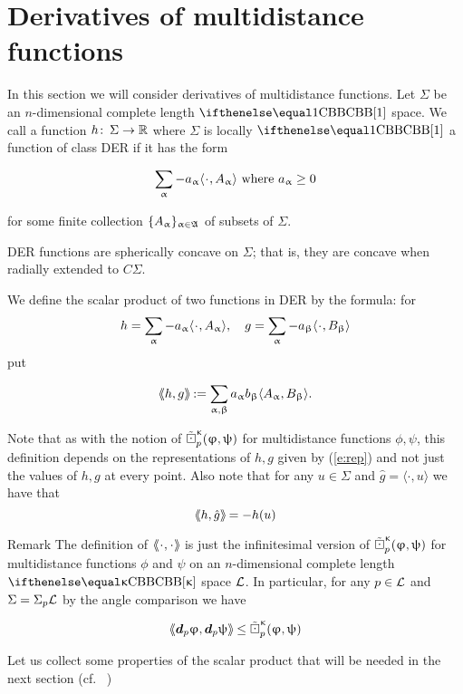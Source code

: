 \section{Derivatives of multidistance functions}
In this section we will consider derivatives of multidistance functions. 
Let $\Sigma$ be an $n$-dimensional complete length $\Alex{1}$ space.
We call a function   $h\co \Sigma\to\R$ where $\Sigma$ is locally $\Alex1$ a function of class DER
if it has the form

\[
\sum_\a -a_\a\langle \cdot, {A_\a}\rangle \text{  where } a_\a\ge 0%
\]

for some  finite collection $\{A_\a\}_{\a\in \frak A}$ of subsets of $\Sigma$.

DER functions are spherically concave on $\Sigma$; 
that is, they are concave when radially extended to $C\Sigma$.


We define the scalar product of two functions in DER by the formula:
for
\begin{equation}\label{e:rep}
h=\sum_\a -a_\a\langle \cdot, {A_\a}\rangle, \quad g=\sum_\a -a_\beta\langle \cdot, {B_\beta}\rangle
\end{equation}
put 

\[
\hbox{$\langle\hskip-0.25em\langle$} h, g\hbox{$\rangle\hskip-0.25em\rangle\hskip-0.1em$}:=\sum_{\upalpha,\upbeta}a_\upalpha b_\upbeta \langle A_\upalpha, B_\upbeta\rangle.
\]


Note that as with the notion of  $\tilde\boxdot^{\upkappa}_p({\upvarphi},{\uppsi})$ for multidistance functions  $\phi,\psi$, this definition depends on the representations of $h,g$ given by (\ref{e:rep}) and not just the values of $h,g$ at every point. Also note that for any $u\in \Sigma$ and $\hat g=\langle \cdot, u\rangle$ we have that
\[
\hbox{$\langle\hskip-0.25em\langle$} h, \hat g\hbox{$\rangle\hskip-0.25em\rangle\hskip-0.1em$}=-h(u)
\]

\begin{thm}{Remark}\label{box-scalar-ineq} 
The definition of  $\dlang \cdot, \cdot \drang$ is just the infinitesimal version of $\tilde\boxdot^{\upkappa}_p({\upvarphi},{\uppsi})$ for multidistance functions $\phi$ and $\psi$ on an $n$-dimensional complete length $\Alex{\kappa}$ space $\mathcal{L}$. 
In particular, for any  $p\in\spc{L}$ and $\Sigma=\Sigma_p\mathcal{L}$ by the angle comparison we have

\[
\dlang \d_p\phi, \d_p\psi\drang\le \sdk\kappa{p}{\phi}{\psi}
\]

\end{thm}
Let us collect some properties of the scalar product that will be needed in the next section (cf. ~\cite{Per-Morse})


